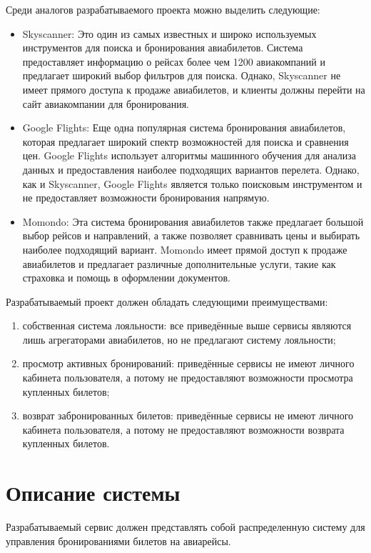 Среди аналогов разрабатываемого проекта можно выделить следующие:
\begin{itemize}
    \item Skyscanner: Это один из самых известных и широко используемых инструментов для поиска и бронирования авиабилетов. Система предоставляет информацию о рейсах более чем 1200 авиакомпаний и предлагает широкий выбор фильтров для поиска. Однако, Skyscanner не имеет прямого доступа к продаже авиабилетов, и клиенты должны перейти на сайт авиакомпании для бронирования.
    \item Google Flights: Еще одна популярная система бронирования авиабилетов, которая предлагает широкий спектр возможностей для поиска и сравнения цен. Google Flights использует алгоритмы машинного обучения для анализа данных и предоставления наиболее подходящих вариантов перелета. Однако, как и Skyscanner, Google Flights является только поисковым инструментом и не предоставляет возможности бронирования напрямую.
    \item Momondo: Эта система бронирования авиабилетов также предлагает большой выбор рейсов и направлений, а также позволяет сравнивать цены и выбирать наиболее подходящий вариант. Momondo имеет прямой доступ к продаже авиабилетов и предлагает различные дополнительные услуги, такие как страховка и помощь в оформлении документов.
\end{itemize}

Разрабатываемый проект должен обладать следующими преимуществами:
\begin{enumerate}
	\item собственная система лояльности: все приведённые выше сервисы являются лишь агрегаторами авиабилетов, но не предлагают систему лояльности;
	\item просмотр активных бронирований: приведённые сервисы не имеют личного кабинета пользователя, а потому не предоставляют возможности просмотра купленных билетов;
	\item возврат забронированных билетов: приведённые сервисы не имеют личного кабинета пользователя, а потому не предоставляют возможности возврата купленных билетов.
\end{enumerate}

\section*{Описание системы}

Разрабатываемый сервис должен представлять собой распределенную систему для управления бронированиями билетов на авиарейсы.

